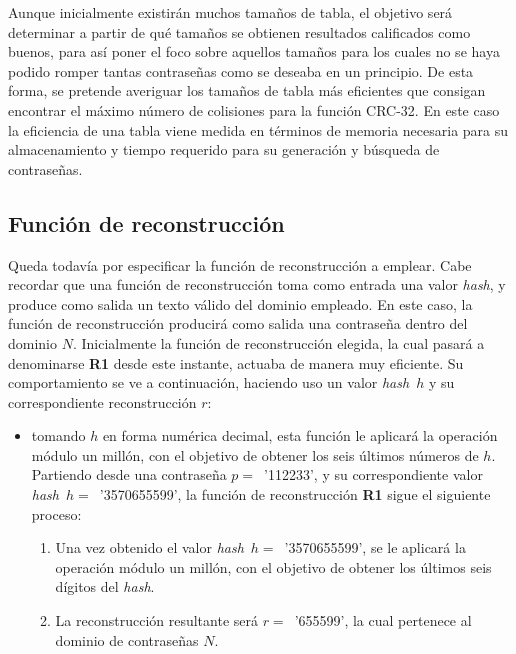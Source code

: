 \documentclass[12pt,spanish,listoffigures,listoftables,listofalgorithms]{tfgetsinf}
\newcommand{\hash}{\textit{hash}}
\begin{document}

Aunque inicialmente existirán muchos tamaños de tabla, el objetivo será determinar a partir de qué tamaños se obtienen resultados calificados como buenos, para así poner el foco sobre aquellos tamaños para los cuales no se haya podido romper tantas contraseñas como se deseaba en un principio. De esta forma, se pretende averiguar los tamaños de tabla más eficientes que consigan encontrar el máximo número de colisiones para la función CRC-32. En este caso la eficiencia de una tabla viene medida en términos de memoria necesaria para su almacenamiento y tiempo requerido para su generación y búsqueda de contraseñas.

\subsection{Función de reconstrucción}

Queda todavía por especificar la función de reconstrucción a emplear. Cabe recordar que una función de reconstrucción toma como entrada una valor \hash, y produce como salida un texto válido del dominio empleado. En este caso, la función de reconstrucción producirá como salida una contraseña dentro del dominio $N$. Inicialmente la función de reconstrucción elegida, la cual pasará a denominarse \textbf{R1} desde este instante, actuaba de manera muy eficiente. Su comportamiento se ve a continuación, haciendo uso un valor \hash~$h$ y su correspondiente reconstrucción $r$:

\begin{itemize}

	\item tomando $h$ en forma numérica decimal, esta función le aplicará la operación módulo un millón, con el objetivo de obtener los seis últimos números de $h$. Partiendo desde una contraseña $p = $~'112233', y su correspondiente valor \hash~$h = $~'3570655599', la función de reconstrucción \textbf{R1} sigue el siguiente proceso:

		\begin{enumerate}

			\item Una vez obtenido el valor \hash~$h = $~'3570655599', se le aplicará la operación módulo un millón, con el objetivo de obtener los últimos seis dígitos del \hash.

			\item La reconstrucción resultante será $r = $~'655599', la cual pertenece al dominio de contraseñas $N$.

		\end{enumerate}

\end{itemize}
\end{document}
